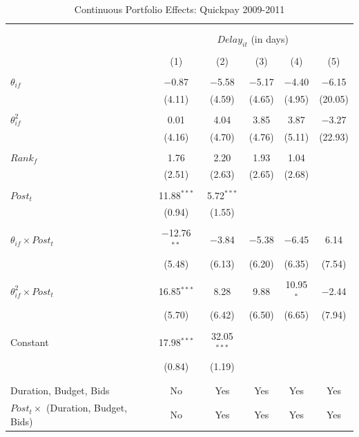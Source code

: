 \documentclass[
]{article}
\begin{document}
\begin{table}[H] \centering 
  \caption{Continuous Portfolio Effects: Quickpay 2009-2011} 
  \label{} 
\small 
\begin{tabular}{@{\extracolsep{-2pt}}lccccc} 
\\[-1.8ex]\hline 
\hline \\[-1.8ex] 
\\[-1.8ex] & \multicolumn{5}{c}{$Delay_{it}$ (in days)} \\ 
\\[-1.8ex] & (1) & (2) & (3) & (4) & (5)\\ 
\hline \\[-1.8ex] 
 $\theta_{if}$ & $-$0.87 & $-$5.58 & $-$5.17 & $-$4.40 & $-$6.15 \\ 
  & (4.11) & (4.59) & (4.65) & (4.95) & (20.05) \\ 
  & & & & & \\ 
 $\theta_{if}^2$ & 0.01 & 4.04 & 3.85 & 3.87 & $-$3.27 \\ 
  & (4.16) & (4.70) & (4.76) & (5.11) & (22.93) \\ 
  & & & & & \\ 
 $Rank_f$ & 1.76 & 2.20 & 1.93 & 1.04 &  \\ 
  & (2.51) & (2.63) & (2.65) & (2.68) &  \\ 
  & & & & & \\ 
 $Post_t$ & 11.88$^{***}$ & 5.72$^{***}$ &  &  &  \\ 
  & (0.94) & (1.55) &  &  &  \\ 
  & & & & & \\ 
 $\theta_{if} \times Post_t$ & $-$12.76$^{**}$ & $-$3.84 & $-$5.38 & $-$6.45 & 6.14 \\ 
  & (5.48) & (6.13) & (6.20) & (6.35) & (7.54) \\ 
  & & & & & \\ 
 $\theta_{if}^2 \times Post_t$ & 16.85$^{***}$ & 8.28 & 9.88 & 10.95$^{*}$ & $-$2.44 \\ 
  & (5.70) & (6.42) & (6.50) & (6.65) & (7.94) \\ 
  & & & & & \\ 
 Constant & 17.98$^{***}$ & 32.05$^{***}$ &  &  &  \\ 
  & (0.84) & (1.19) &  &  &  \\ 
  & & & & & \\ 
\hline \\[-1.8ex] 
Duration, Budget, Bids & No & Yes & Yes & Yes & Yes \\ 
$Post_t \times$  (Duration, Budget, Bids) & No & Yes & Yes & Yes & Yes \\ 

\end{tabular}
\end{table}
\end{document}
